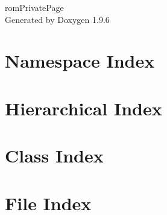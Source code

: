 \documentclass[twoside]{book}
\newcommand{\+}{\discretionary{\mbox{\scriptsize$\hookleftarrow$}}{}{}}
\newcommand{\clearemptydoublepage}{%
    \newpage{\pagestyle{empty}\cleardoublepage}%
  }
\begin{document}
  \raggedbottom
    \hypersetup{pageanchor=false,
                bookmarksnumbered=true,
                pdfencoding=unicode
               }
  \begin{titlepage}
  \vspace*{7cm}
  \begin{center}%
  {\Large rom\+Private\+Page}\\
  \vspace*{1cm}
  {\large Generated by Doxygen 1.9.6}\\
  \end{center}
  \end{titlepage}
  \clearemptydoublepage
  \tableofcontents
  \clearemptydoublepage
  \hypersetup{pageanchor=true}
\chapter{Namespace Index}

\chapter{Hierarchical Index}

\chapter{Class Index}

\chapter{File Index}

\end{document}
